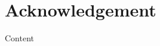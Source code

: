\documentclass[]{aiaa-tc}%
\begin{document}





\section*{Acknowledgement}

Content





\end{document}
